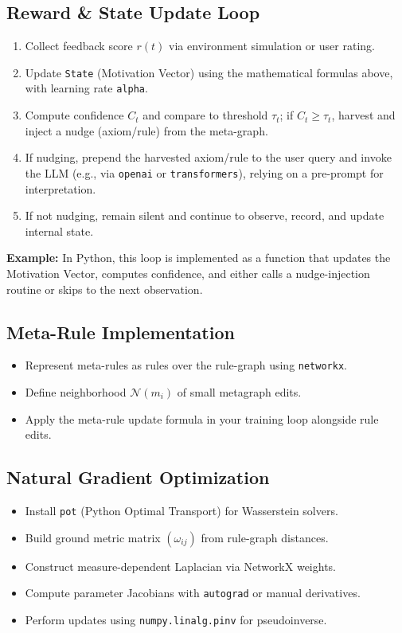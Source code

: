 \documentclass[11pt]{article}
\begin{document}
\subsection{Reward \& State Update Loop}
\begin{enumerate}
  \item Collect feedback score $r(t)$ via environment simulation or user rating.
  \item Update \texttt{State} (Motivation Vector) using the mathematical formulas above, with learning rate \texttt{alpha}.
  \item Compute confidence $C_t$ and compare to threshold $\tau_t$; if $C_t \geq \tau_t$, harvest and inject a nudge (axiom/rule) from the meta-graph.
  \item If nudging, prepend the harvested axiom/rule to the user query and invoke the LLM (e.g., via \texttt{openai} or \texttt{transformers}), relying on a pre-prompt for interpretation.
  \item If not nudging, remain silent and continue to observe, record, and update internal state.
\end{enumerate}
\textbf{Example:} In Python, this loop is implemented as a function that updates the Motivation Vector, computes confidence, and either calls a nudge-injection routine or skips to the next observation.

\subsection{Meta-Rule Implementation}
\begin{itemize}
  \item Represent meta-rules as rules over the rule-graph using \texttt{networkx}.
  \item Define neighborhood $\mathcal{N}(m_i)$ of small metagraph edits.
  \item Apply the meta-rule update formula in your training loop alongside rule edits.
\end{itemize}

\subsection{Natural Gradient Optimization}
\begin{itemize}
  \item Install \texttt{pot} (Python Optimal Transport) for Wasserstein solvers.
  \item Build ground metric matrix $(\omega_{ij})$ from rule-graph distances.
  \item Construct measure-dependent Laplacian via NetworkX weights.
  \item Compute parameter Jacobians with \texttt{autograd} or manual derivatives.
  \item Perform updates using \texttt{numpy.linalg.pinv} for pseudoinverse.
\end{itemize}
\end{document}

